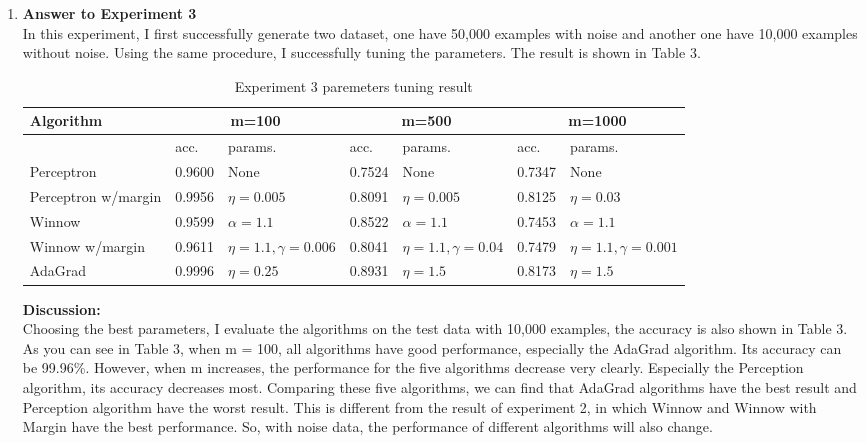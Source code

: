 \begin{enumerate}
\item {\bf Answer to Experiment 3}\\

In this experiment, I first successfully generate two dataset, one have 50,000 examples with noise and another one have 10,000 examples without noise. Using the same procedure, I successfully tuning the parameters. The result is shown in Table 3.\\

\begin{table}[H]
\caption {Experiment 3 paremeters tuning result} \label{tab:title} 
\begin{center}
  \begin{tabular}{|p{3.0cm}|l|p{2.2cm}|l|p{2.2cm}|l|p{2.2cm}|}
\hline
 Algorithm &  \multicolumn{2}{c|}{m=100} & \multicolumn{2}{c|}{m=500} & \multicolumn{2}{c|}{m=1000}\\\hline\hline
 & acc. & params. & acc. & params. & acc. & params.\\\hline
 Perceptron          & 0.9600 & None &  0.7524 & None & 0.7347 & None\\\hline
 Perceptron w/margin & 0.9956 & $\eta=0.005$ & 0.8091 &$\eta=0.005$ & 0.8125 & $\eta=0.03$ \\\hline
 Winnow              & 0.9599 & $\alpha=1.1$ & 0.8522 & $\alpha=1.1$ & 0.7453 & $\alpha=1.1$ \\\hline
 Winnow w/margin     & 0.9611 & $\eta=1.1, \gamma=0.006$ & 0.8041 & $\eta=1.1, \gamma=0.04$ & 0.7479 & $\eta=1.1, \gamma=0.001$ \\\hline
 AdaGrad             & 0.9996 & $\eta=0.25$ & 0.8931 & $\eta=1.5$ & 0.8173 & $\eta=1.5$ \\\hline
\end{tabular}
\end{center}
\end{table}

{\bf Discussion:\\}
Choosing the best parameters, I evaluate the algorithms on the test data with 10,000 examples, the accuracy is also shown in Table 3. As you can see in Table 3, when m = 100, all algorithms have good performance, especially the AdaGrad algorithm. Its accuracy can be 99.96\%. However, when m increases, the performance for the five algorithms decrease very clearly. Especially the Perception algorithm, its accuracy decreases most. Comparing these five algorithms, we can find that AdaGrad algorithms have the best result and Perception algorithm have the worst result. This is different from the result of experiment 2, in which Winnow and Winnow with Margin have the best performance. So, with noise data, the performance of different algorithms will also change.\\


\end{enumerate}
